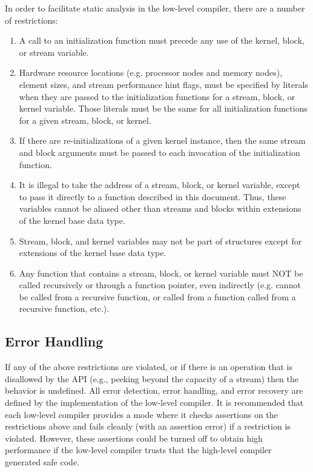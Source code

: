 \noindent In order to facilitate static analysis in the low-level
compiler, there are a number of restrictions:

\renewcommand{\labelenumi}{B\theenumi.}

\begin{enumerate}

\item A call to an initialization function must precede any use of the
kernel, block, or stream variable.

\item Hardware resource locations (e.g. processor nodes and memory
nodes), element sizes, and stream performance hint flags, must be
specified by literals when they are passed to the initialization
functions for a stream, block, or kernel variable. Those literals must
be the same for all initialization functions for a given stream,
block, or kernel.

\item If there are re-initializations of a given kernel instance, then
the same stream and block arguments must be passed to each invocation
of the initialization function.

\item It is illegal to take the address of a stream, block, or kernel
variable, except to pass it directly to a function described in this
document. Thus, these variables cannot be aliased other than streams
and blocks within extensions of the kernel base data type.

\item Stream, block, and kernel variables may not be part of
structures except for extensions of the kernel base data type.

\item Any function that contains a stream, block, or kernel variable
must NOT be called recursively or through a function pointer, even
indirectly (e.g. cannot be called from a recursive function, or called
from a function called from a recursive function, etc.).

\end{enumerate}

\subsection{Error Handling}

If any of the above restrictions are violated, or if there is an
operation that is disallowed by the API (e.g., peeking beyond the
capacity of a stream) then the behavior is undefined.  All error
detection, error handling, and error recovery are defined by the
implementation of the low-level compiler.  It is recommended that each
low-level compiler provides a mode where it checks assertions on the
restrictions above and fails cleanly (with an assertion error) if a
restriction is violated.  However, these assertions could be turned
off to obtain high performance if the low-level compiler trusts that
the high-level compiler generated safe code.

